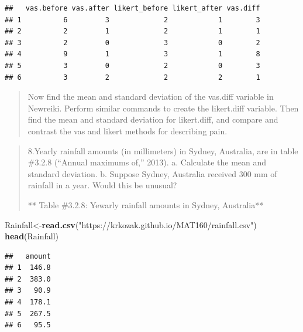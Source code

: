 \documentclass[]{book}
\newenvironment{Shaded}{\begin{snugshade}}{\end{snugshade}}
\newcommand{\DataTypeTok}[1]{\textcolor[rgb]{0.13,0.29,0.53}{#1}}
\newcommand{\KeywordTok}[1]{\textcolor[rgb]{0.13,0.29,0.53}{\textbf{#1}}}
\newcommand{\NormalTok}[1]{#1}
\newcommand{\OperatorTok}[1]{\textcolor[rgb]{0.81,0.36,0.00}{\textbf{#1}}}
\newcommand{\StringTok}[1]{\textcolor[rgb]{0.31,0.60,0.02}{#1}}
\begin{document}
\begin{Shaded}
\end{Shaded}

\begin{verbatim}
##   vas.before vas.after likert_before likert_after vas.diff
## 1          6         3             2            1        3
## 2          2         1             2            1        1
## 3          2         0             3            0        2
## 4          9         1             3            1        8
## 5          3         0             2            0        3
## 6          3         2             2            2        1
\end{verbatim}

\begin{quote}
Now find the mean and standard deviation of the vas.diff variable in Newreiki. Perform similar commands to create the likert.diff variable. Then find the mean and standard deviation for likert.diff, and compare and contrast the vas and likert methods for describing pain.
\end{quote}

\begin{quote}
8.Yearly rainfall amounts (in millimeters) in Sydney, Australia, are in table \#3.2.8
(``Annual maximums of,'' 2013).
a. Calculate the mean and standard deviation.
b. Suppose Sydney, Australia received 300 mm of rainfall in a year. Would this be unusual?

** Table \#3.2.8: Yewarly rainfall amounts in Sydney, Australia**
\end{quote}

\begin{Shaded}
\begin{Highlighting}[]
\NormalTok{Rainfall<-}\KeywordTok{read.csv}\NormalTok{(}\StringTok{"https://krkozak.github.io/MAT160/rainfall.csv"}\NormalTok{)}
\KeywordTok{head}\NormalTok{(Rainfall)}
\end{Highlighting}
\end{Shaded}

\begin{verbatim}
##   amount
## 1  146.8
## 2  383.0
## 3   90.9
## 4  178.1
## 5  267.5
## 6   95.5
\end{verbatim}
\end{document}
